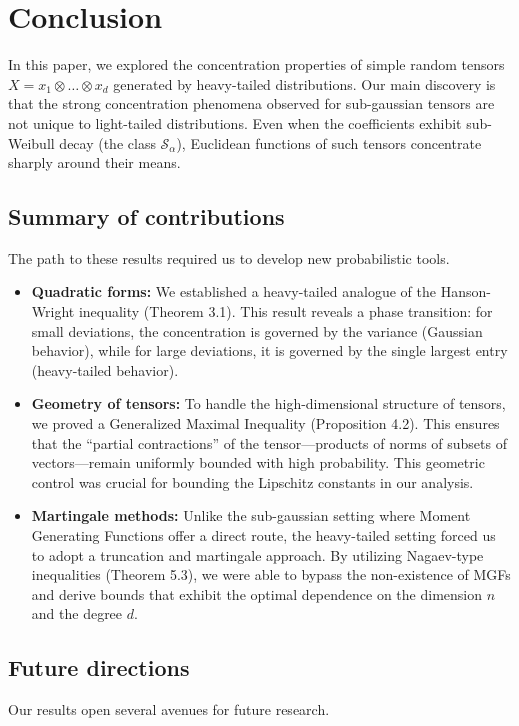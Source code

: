 \documentclass[11pt]{amsart}
\theoremstyle{definition}
\theoremstyle{remark}
\begin{document}
\section{Conclusion}

In this paper, we explored the concentration properties of simple random tensors $X = x_1 \otimes \dots \otimes x_d$ generated by heavy-tailed distributions. Our main discovery is that the strong concentration phenomena observed for sub-gaussian tensors are not unique to light-tailed distributions. Even when the coefficients exhibit sub-Weibull decay (the class $\mathcal{S}_\alpha$), Euclidean functions of such tensors concentrate sharply around their means.

\subsection{Summary of contributions}
The path to these results required us to develop new probabilistic tools.

\begin{itemize}
    \item \textbf{Quadratic forms:} We established a heavy-tailed analogue of the Hanson-Wright inequality (Theorem 3.1). This result reveals a phase transition: for small deviations, the concentration is governed by the variance (Gaussian behavior), while for large deviations, it is governed by the single largest entry (heavy-tailed behavior).
    
    \item \textbf{Geometry of tensors:} To handle the high-dimensional structure of tensors, we proved a Generalized Maximal Inequality (Proposition 4.2). This ensures that the ``partial contractions'' of the tensor—products of norms of subsets of vectors—remain uniformly bounded with high probability. This geometric control was crucial for bounding the Lipschitz constants in our analysis.
    
    \item \textbf{Martingale methods:} Unlike the sub-gaussian setting where Moment Generating Functions offer a direct route, the heavy-tailed setting forced us to adopt a truncation and martingale approach. By utilizing Nagaev-type inequalities (Theorem 5.3), we were able to bypass the non-existence of MGFs and derive bounds that exhibit the optimal dependence on the dimension $n$ and the degree $d$.
\end{itemize}

\subsection{Future directions}
Our results open several avenues for future research.
\end{document}

